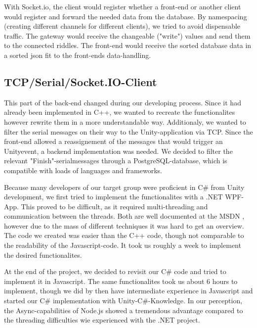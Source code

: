With Socket.io, the client would register whether a front-end or another client would register and forward the needed data from the database. 
By namespacing (creating different channels for different clients), we tried to avoid dispensable traffic.
The gateway would receive the changeable ("write") values and send them to the connected riddles.
The front-end would receive the sorted database data in a sorted json fit to the front-ends data-handling.

\subsection{TCP/Serial/Socket.IO-Client}
This part of the back-end changed during our developing process. 
Since it had already been implemented in C++, we wanted to recreate the functionalites however rewrite them in a more understandable way. 
Additionaly, we wanted to filter the serial messages on their way to the Unity-application via TCP.
Since the front-end allowed a reassignement of the messages that would trigger an Unityevent, a backend implementation was needed.
We decided to filter the relevant "Finish"-serialmessages through a PostgreSQL-database, which is compatible with loads of languages and frameworks.

Because many developers of our target group were proficient in C\# from Unity development, we first tried to implement the functionalites with a .NET WPF-App.
This proved to be difficult, as it required multi-threading and communication between the threads. Both are well documented at the MSDN \parencite{MSDN}, 
however due to the mass of different techniques it was hard to get an overview. 
The code we created was easier than the C++ code, though not comparable to the readability of the Javascript-code.
It took us roughly a week to implement the desired functionalites. 

At the end of the project, we decided to revisit our C\# code and tried to implement it in Javascript.
The same functionalites took us about 6 hours to implement, though we did by then have intermediate experience in Javascript and started our C\# implementation with Unity-C\#-Knowledge.
In our perception, the Async-capabilities of Node.js showed a tremendous advantage compared to the threading difficulties wie experienced with the .NET project.

